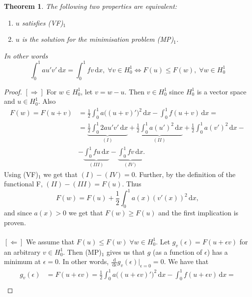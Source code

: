 \documentclass[12pt, a4paper]{article}
\newcommand{\rd}{\ensuremath{\mathrm{d}}}
\newcommand{\id}{\ensuremath{\,\rd}}
\newtheorem{theorem}{Theorem}[section]
\numberwithin{equation}{section}
\begin{document}
\begin{theorem}
The following two properties are equivalent:
\begin{enumerate}[label={(\roman*)}]
    \item $u$ satisfies \textnormal{(VF)}$_1$
    \item $u$ is the solution for the minimisation problem \textnormal{(MP)}$_1$.
\end{enumerate}
In other words
    \begin{equation*}
    \int_0^1 au'v' \id x = \int_0^1 fv\id x,\; \forall v\in H_0^1 \Longleftrightarrow F(u) \leq F(w),\; \forall w \in H_0^1
    \end{equation*}
\end{theorem}
\begin{proof}
$[\Rightarrow ]$ For $w\in H_0^1$, let $v=w-u$. Then $v\in H_0^1$ since $H_0^1$ is a vector space and $u\in H_0^1$. Also
\begin{equation*}
\begin{split}
F(w) = F(u+v) &= \frac{1}{2}\int_0^1 a\big ( (u+v)' \big )^2 \id x - \int_0^1 f(u+v)\id x = \\
&=\underbrace{\frac{1}{2}\int_0^1 2au'v'\id x}_{(I)} + \underbrace{\frac{1}{2}\int_0^1 a(u')^2\id x}_{(II)} + \frac{1}{2}\int_0^1 a(v')^2\id x - \\
&- \underbrace{\int_0^1 fu \id x}_{(III)} - \underbrace{\int_0^1 fv \id x}_{(IV)}.
\end{split}
\end{equation*}
Using (VF)$_1$ we get that $(I) - (IV) = 0$. Further, by the definition of the functional F, $(II) - (III) = F(u)$. Thus
\begin{equation*}
F(w) = F(u) + \frac{1}{2}\int_0^1 a(x)(v'(x))^2\id x,
\end{equation*}
and since $a(x)>0$ we get that $F(w)\geq F(u)$ and the first implication is proven.
\\\\
$[\Leftarrow ]$ We assume that $F(u)\leq F(w)\; \forall w\in H_0^1$. Let $g_v(\epsilon) = F(u+\epsilon v)$ for an arbitrary $v\in H_0^1$. Then (MP)$_1$ gives us that $g$ (as a function of $\epsilon$) has a minimum at $\epsilon = 0$. In other words, $\frac{\id}{\id \epsilon}g_v(\epsilon) \big |_{\epsilon = 0} = 0$. We have that
\begin{equation*}
\begin{split}
g_v(\epsilon) &= F(u+\epsilon v) = \frac{1}{2}\int_0^1 a \big ( (u+\epsilon v)'\big )^2\id x - \int_0^1 f(u+\epsilon v)\id x = \\

\end{split}
\end{equation*}
\end{proof}
\end{document}
